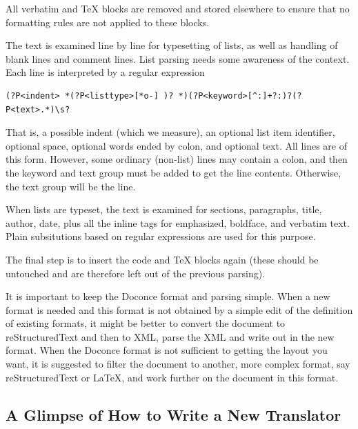 \documentclass{article}
\begin{document}
All verbatim and TeX blocks are removed and stored elsewhere
to ensure that no formatting rules are not applied to these blocks.

The text is examined line by line for typesetting of lists, as well as
handling of blank lines and comment lines.
List parsing needs some awareness of the context.
Each line is interpreted by a regular expression
\begin{Verbatim}[fontsize=\fontsize{9pt}{9pt},tabsize=8,baselinestretch=0.85,
fontfamily=tt,xleftmargin=7mm]
(?P<indent> *(?P<listtype>[*o-] )? *)(?P<keyword>[^:]+?:)?(?P<text>.*)\s?
\end{Verbatim}
\noindent

That is, a possible indent (which we measure), an optional list
item identifier, optional space, optional words ended by colon,
and optional text. All lines are of this form. However, some
ordinary (non-list) lines may contain a colon, and then the keyword
and text group must be added to get the line contents. Otherwise,
the text group will be the line.

When lists are typeset, the text is examined for sections, paragraphs,
title, author, date, plus all the inline tags for emphasized, boldface,
and verbatim text. Plain subsitutions based on regular expressions
are used for this purpose.

The final step is to insert the code and TeX blocks again (these should
be untouched and are therefore left out of the previous parsing).

It is important to keep the Doconce format and parsing simple.  When a
new format is needed and this format is not obtained by a simple edit
of the definition of existing formats, it might be better to convert
the document to reStructuredText and then to XML, parse the XML and
write out in the new format.  When the Doconce format is not
sufficient to getting the layout you want, it is suggested to filter
the document to another, more complex format, say reStructuredText or
{\LaTeX}, and work further on the document in this format.

\subsection{A Glimpse of How to Write a New Translator}
\end{document}
